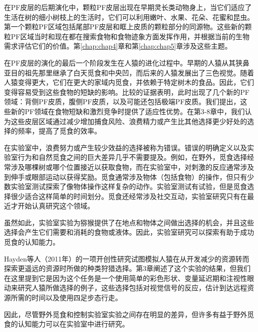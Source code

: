 在PF皮层的后期演化中，颗粒PF皮层出现在早期灵长类动物身上，当它们适应了生活在树的细小树枝上的生活时，它们可以利用嫩叶、水果、花朵、花蜜和昆虫。第一个颗粒PF区域包括尾部PF皮层和眶上皮质的颗粒部分的同源物。这些新的颗粒PF区域当时和现在都在搜索食物和食物迹象方面发挥作用，并根据当前的生物需求评估它们的价值。第\ref{chap:chap4}章和第\ref{chap:chap5}章涉及这些主题。

在PF皮层的演化的最后一个阶段发生在人猿的进化过程中。早期的人猿从其狭鼻亚目的祖先那里继承了白天觅食和中央凹，而后来的人猿发展出了三色视觉。随着人猿变得更大，它们在更大的家域内觅食，并依赖于特定树木的食品。因此，它们变得容易受到这些食物的短缺的影响。比较的证据表明，此时出现了几个新的PF领域：背侧PF皮质，腹侧PF皮质，以及可能还包括极端PF皮质。我们提出，这些新的PF领域在食物短缺和激烈竞争时提供了适应性优势。在第3-8章中，我们认为这些皮层区域通过减少增加捕食风险、浪费精力或产生比其他选择更少好处的选择的频率，提高了觅食的效率。

在实验室中，浪费努力或产生较少效益的选择被称为错误。错误的明确定义以及实验室行为和自然觅食之间的巨大差异几乎不需要提及。例如，在野外，觅食选择经常涉及哪棵树或哪个位置接近以获取食物，而在实验室中，对刺激的反应通常涉及到伸手或眼部运动以获得奖励。觅食通常涉及物体（包括食物）的操作，但只有少数实验室测试探索了像物体操作这样复杂的动作。实验室测试有试验，但是觅食选择很少适合这样简单的时间划分。觅食还经常涉及社交互动，实验室研究只有在最近才开始认真研究这个领域。

虽然如此，实验室实验为猕猴提供了在地点和物体之间做出选择的机会，并且这些选择会产生它们需要和消耗的食物或液体。因此，实验室研究可以探索有助于成功觅食的认知能力。

Hayden等人（2011年）的一项开创性研究试图模拟人猿在从开发减少的资源转而探索更遥远的资源时所做的种类狩猎选择。第3章阐述了这个实验的结果，但我们在这里提到它是因为这个任务是一个使用简单的彩色形状、变量延迟期和注视性眼动来研究人猿所做选择的例子，这些选择包括对视觉信号的反应，估计到达远程资源所需的时间以及使用四足步态行走。

因此，尽管野外觅食和控制实验室实验之间存在明显的差异，但许多有益于野外觅食的认知能力可以在实验室中进行研究。

